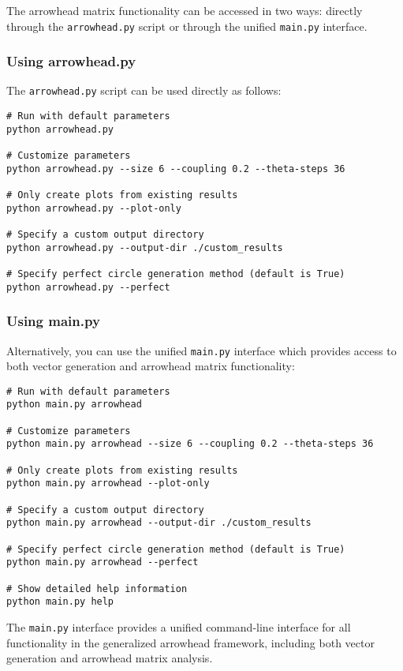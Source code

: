 The arrowhead matrix functionality can be accessed in two ways: directly through the \texttt{arrowhead.py} script or through the unified \texttt{main.py} interface.

\subsubsection{Using arrowhead.py}

The \texttt{arrowhead.py} script can be used directly as follows:

\begin{verbatim}
# Run with default parameters
python arrowhead.py

# Customize parameters
python arrowhead.py --size 6 --coupling 0.2 --theta-steps 36

# Only create plots from existing results
python arrowhead.py --plot-only

# Specify a custom output directory
python arrowhead.py --output-dir ./custom_results

# Specify perfect circle generation method (default is True)
python arrowhead.py --perfect
\end{verbatim}

\subsubsection{Using main.py}

Alternatively, you can use the unified \texttt{main.py} interface which provides access to both vector generation and arrowhead matrix functionality:

\begin{verbatim}
# Run with default parameters
python main.py arrowhead

# Customize parameters
python main.py arrowhead --size 6 --coupling 0.2 --theta-steps 36

# Only create plots from existing results
python main.py arrowhead --plot-only

# Specify a custom output directory
python main.py arrowhead --output-dir ./custom_results

# Specify perfect circle generation method (default is True)
python main.py arrowhead --perfect

# Show detailed help information
python main.py help
\end{verbatim}

The \texttt{main.py} interface provides a unified command-line interface for all functionality in the generalized arrowhead framework, including both vector generation and arrowhead matrix analysis.

